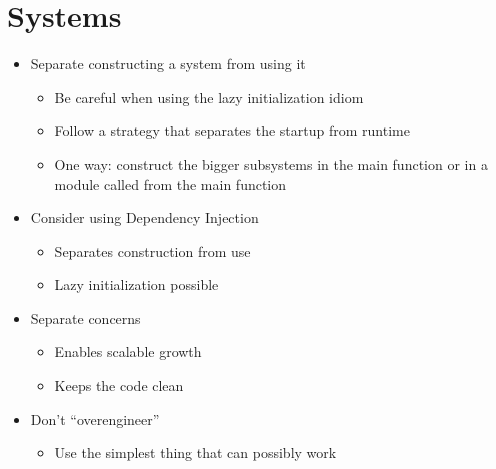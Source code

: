 \section{Systems}
\begin{itemize}
    \item Separate constructing a system from using it
    \begin{itemize}
        \item Be careful when using the lazy initialization idiom
        \item Follow a strategy that separates the startup from runtime
        \item One way: construct the bigger subsystems in the main function or in a module called from the main function
    \end{itemize}
    \item Consider using Dependency Injection
    \begin{itemize}
        \item Separates construction from use
        \item Lazy initialization possible
    \end{itemize}
    \item Separate concerns
    \begin{itemize}
        \item Enables scalable growth
        \item Keeps the code clean
    \end{itemize}
    \item Don't ``overengineer''
    \begin{itemize}
        \item Use the simplest thing that can possibly work
    \end{itemize}
\end{itemize}
